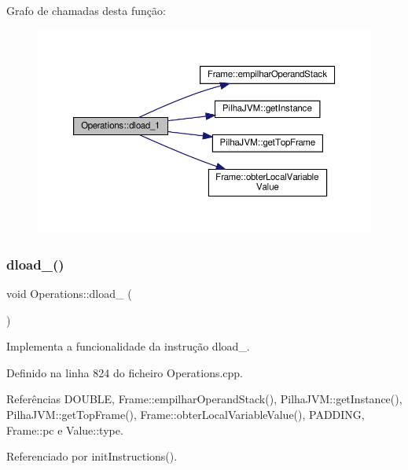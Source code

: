 Grafo de chamadas desta função\+:\nopagebreak
\begin{figure}[H]
\begin{center}
\leavevmode
\includegraphics[width=350pt]{classOperations_a64632251d88964ff4da0d981103e099c_cgraph}
\end{center}
\end{figure}
\mbox{\label{classOperations_a55b89c1780e7f91ad7b6da5747d8c6ba}} 
\subsubsection{\texorpdfstring{dload\+\_()}{dload\_2()}}
{\footnotesize\ttfamily void Operations\+::dload\+\_ (\begin{DoxyParamCaption}{ }\end{DoxyParamCaption})\hspace{0.3cm}{\ttfamily [private]}}



Implementa a funcionalidade da instrução dload\+\_. 



Definido na linha 824 do ficheiro Operations.\+cpp.



Referências D\+O\+U\+B\+LE, Frame\+::empilhar\+Operand\+Stack(), Pilha\+J\+V\+M\+::get\+Instance(), Pilha\+J\+V\+M\+::get\+Top\+Frame(), Frame\+::obter\+Local\+Variable\+Value(), P\+A\+D\+D\+I\+NG, Frame\+::pc e Value\+::type.



Referenciado por init\+Instructions().


